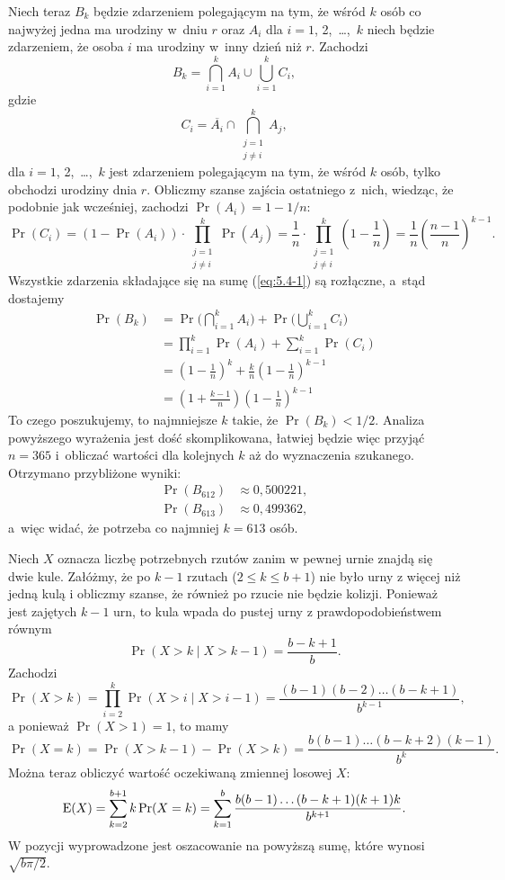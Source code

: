 Niech teraz $B_k$ będzie zdarzeniem polegającym na tym, że wśród $k$ osób co najwyżej jedna ma urodziny w~dniu $r$ oraz $A_i$ dla $i=1$, 2,~\dots,~$k$ niech będzie zdarzeniem, że osoba $i$ ma urodziny w~inny dzień niż $r$. Zachodzi
\[
	B_k = \bigcap_{i=1}^kA_i\cup\bigcup_{i=1}^kC_i, \tag{$*$}\label{eq:5.4-1}
\]
gdzie
\[
	C_i = \overline{A_i}\cap\bigcap_{\substack{j=1\\j\ne i}}^kA_j,
\]
dla $i=1$, 2,~\dots,~$k$ jest zdarzeniem polegającym na tym, że wśród $k$ osób, tylko  obchodzi urodziny dnia $r$. Obliczmy szanse zajścia ostatniego z~nich, wiedząc, że podobnie jak wcześniej, zachodzi $\Pr(A_i)=1-1/n$:
\[
	\Pr(C_i) = (1-\Pr(A_i))\cdot\prod_{\substack{j=1\\j\ne i}}^k\Pr(A_j) = \frac{1}{n}\cdot\prod_{\substack{j=1\\j\ne i}}^k\left(1-\frac{1}{n}\right) = \frac{1}{n}\left(\frac{n-1}{n}\right)^{k-1}.
\]
Wszystkie zdarzenia składające się na sumę (\ref{eq:5.4-1}) są rozłączne, a~stąd dostajemy
\begin{align*}
	\Pr(B_k) &= \Pr\biggl(\bigcap_{i=1}^kA_i\biggr)+\Pr\biggl(\bigcup_{i=1}^kC_i\biggr) \\
	&= \prod_{i=1}^k\Pr(A_i)+\sum_{i=1}^k\Pr(C_i) \\
	&= \left(1-\frac{1}{n}\right)^k+\frac{k}{n}\left(1-\frac{1}{n}\right)^{k-1} \\
	&= \left(1+\frac{k-1}{n}\right)\left(1-\frac{1}{n}\right)^{k-1}
\end{align*}
To czego poszukujemy, to najmniejsze $k$ takie, że $\Pr(B_k)<1/2$. Analiza powyższego wyrażenia jest dość skomplikowana, łatwiej będzie więc przyjąć $n=365$ i~obliczać wartości dla kolejnych $k$ aż do wyznaczenia szukanego. Otrzymano przybliżone wyniki:
\begin{align*}
	\Pr(B_{612}) &\approx 0{,}500221, \\
	\Pr(B_{613}) &\approx 0{,}499362,
\end{align*}
a~więc widać, że potrzeba co najmniej $k=613$ osób.

\exercise %
Niech $X$ oznacza liczbę potrzebnych rzutów zanim w pewnej urnie znajdą się dwie kule. Załóżmy, że po $k-1$ rzutach ($2\le k\le b+1$) nie było urny z więcej niż jedną kulą i obliczmy szanse, że również po  rzucie nie będzie kolizji. Ponieważ jest zajętych $k-1$ urn, to  kula wpada do pustej urny z prawdopodobieństwem równym
\[
	\Pr(X>k\mid X>k-1) = \frac{b-k+1}{b}.
\]
Zachodzi
\[
	\Pr(X>k) = \prod_{i=2}^k\Pr(X>i\mid X>i-1) = \frac{(b-1)(b-2)\dots(b-k+1)}{b^{k-1}},
\]
a ponieważ $\Pr(X>1)=1$, to mamy
\[
	\Pr(X=k) = \Pr(X>k-1)-\Pr(X>k) = \frac{b(b-1)\dots(b-k+2)(k-1)}{b^k}.
\]
Można teraz obliczyć wartość oczekiwaną zmiennej losowej $X$:
\[
	\operatorname{E}(X) = \sum_{k=2}^{b+1}k\Pr(X=k) = \sum_{k=1}^b\frac{b(b-1)\dots(b-k+1)(k+1)k}{b^{k+1}}.
\]
W pozycji \cite{taocp1frag} wyprowadzone jest oszacowanie na powyższą sumę, które wynosi $\sqrt{b\pi/2}$.

